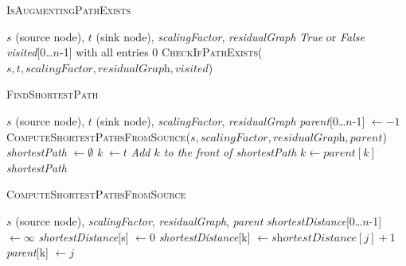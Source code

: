 \documentclass{article}
\begin{document}
\begin{algorithm}[H]
\caption{\textcolor{keywordcolor}{\textsc{IsAugmentingPathExists}}}
\begin{algorithmic}[1]
\State {} $s$ (source node), $t$ (sink node), \textit{scalingFactor}, \textit{residualGraph}
\State {} \textit{True} or \textit{False}
\State {} \textit{visited}[0…$n$-1] with all entries 0
\State \Return \textcolor{identifiercolor}{\textsc{CheckIfPathExists}}($s, t, \textit{scalingFactor}, \textit{residualGraph}, \textit{visited}$)
\end{algorithmic}
\end{algorithm}

\begin{algorithm}[H]
\caption{\textcolor{keywordcolor}{\textsc{FindShortestPath}}}
\begin{algorithmic}[1]
\State {} $s$ (source node), $t$ (sink node), \textit{scalingFactor}, \textit{residualGraph}
\State {} \textit{parent}[0…$n$-1] $\gets -1$
\State \textcolor{identifiercolor}{\textsc{ComputeShortestPathsFromSource}}($s, \textit{scalingFactor}, \textit{residualGraph}, \textit{parent}$)
\State {} \textit{shortestPath} $\gets \emptyset$
\State \textit{k} $\gets t$
    \State \textit{Add $k$ to the front of shortestPath}
    \State $k \gets \textit{parent}[k]$
\EndWhile
\State \Return \textit{shortestPath}
\end{algorithmic}
\end{algorithm}

\begin{algorithm}[H]
\caption{\textcolor{keywordcolor}{\textsc{ComputeShortestPathsFromSource}}}
\begin{algorithmic}[1]
\State {} $s$ (source node), \textit{scalingFactor}, \textit{residualGraph}, \textit{parent}
\State {} \textit{shortestDistance}[0…$n$-1] $\gets \infty$
\State \textit{shortestDistance}[s] $\gets 0$
                        \State \textit{shortestDistance}[k] $\gets \textit{shortestDistance}[j] + 1$
                        \State \textit{parent}[k] $\gets j$
                    \EndIf
                \EndIf
            \EndIf
        \EndFor
    \EndFor
\EndFor
\end{algorithmic}
\end{algorithm}
\end{document}
